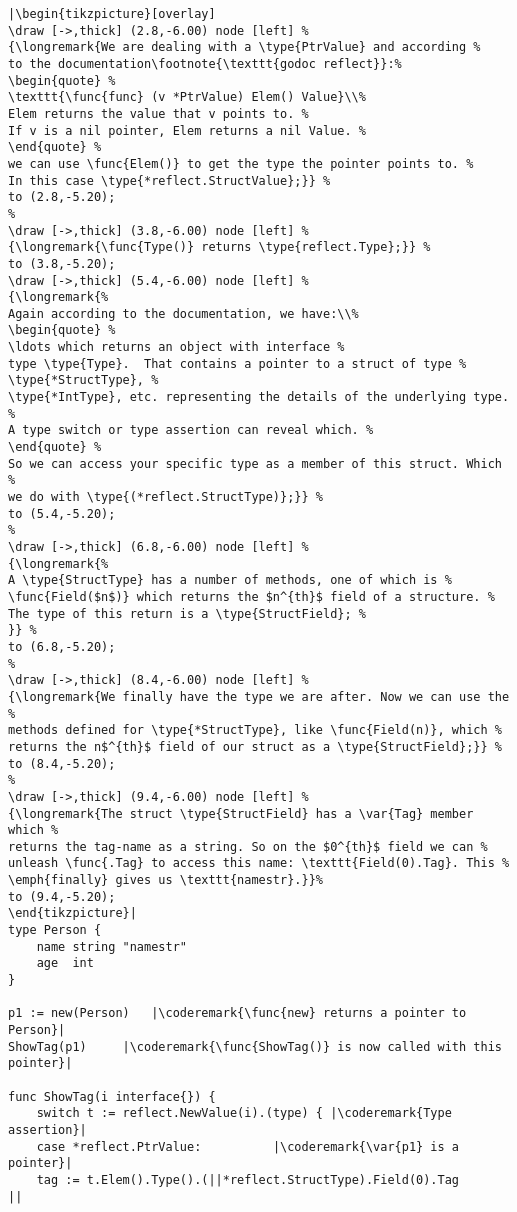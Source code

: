\begin{lstlisting}[caption=Introspection using reflection,label=src:introspection]
|\begin{tikzpicture}[overlay]
\draw [->,thick] (2.8,-6.00) node [left] %
{\longremark{We are dealing with a \type{PtrValue} and according %
to the documentation\footnote{\texttt{godoc reflect}}:%
\begin{quote} %
\texttt{\func{func} (v *PtrValue) Elem() Value}\\%
Elem returns the value that v points to. %
If v is a nil pointer, Elem returns a nil Value. %
\end{quote} %
we can use \func{Elem()} to get the type the pointer points to. %
In this case \type{*reflect.StructValue};}} %
to (2.8,-5.20);
%
\draw [->,thick] (3.8,-6.00) node [left] %
{\longremark{\func{Type()} returns \type{reflect.Type};}} %
to (3.8,-5.20);
\draw [->,thick] (5.4,-6.00) node [left] %
{\longremark{%
Again according to the documentation, we have:\\%
\begin{quote} %
\ldots which returns an object with interface %
type \type{Type}.  That contains a pointer to a struct of type %
\type{*StructType}, %
\type{*IntType}, etc. representing the details of the underlying type. %
A type switch or type assertion can reveal which. %
\end{quote} %
So we can access your specific type as a member of this struct. Which %
we do with \type{(*reflect.StructType)};}} %
to (5.4,-5.20);
%
\draw [->,thick] (6.8,-6.00) node [left] %
{\longremark{%
A \type{StructType} has a number of methods, one of which is %
\func{Field($n$)} which returns the $n^{th}$ field of a structure. %
The type of this return is a \type{StructField}; %
}} %
to (6.8,-5.20);
%
\draw [->,thick] (8.4,-6.00) node [left] %
{\longremark{We finally have the type we are after. Now we can use the %
methods defined for \type{*StructType}, like \func{Field(n)}, which %
returns the n$^{th}$ field of our struct as a \type{StructField};}} %
to (8.4,-5.20);
%
\draw [->,thick] (9.4,-6.00) node [left] %
{\longremark{The struct \type{StructField} has a \var{Tag} member which %
returns the tag-name as a string. So on the $0^{th}$ field we can %
unleash \func{.Tag} to access this name: \texttt{Field(0).Tag}. This %
\emph{finally} gives us \texttt{namestr}.}}%
to (9.4,-5.20);
\end{tikzpicture}|
type Person {
    name string "namestr"
    age  int
}

p1 := new(Person)   |\coderemark{\func{new} returns a pointer to Person}|
ShowTag(p1)	    |\coderemark{\func{ShowTag()} is now called with this pointer}|

func ShowTag(i interface{}) {
    switch t := reflect.NewValue(i).(type) { |\coderemark{Type assertion}|
    case *reflect.PtrValue:		     |\coderemark{\var{p1} is a pointer}|
	tag := t.Elem().Type().(||*reflect.StructType).Field(0).Tag
||
\end{lstlisting}
